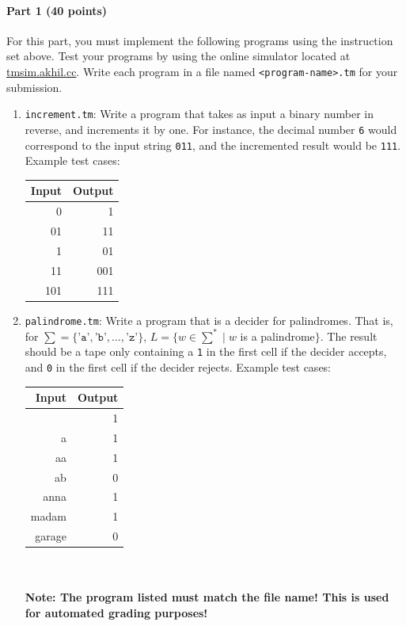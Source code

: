 \documentclass[10pt]{article}
\begin{document}
\paragraph{Part 1 (40 points)} For this part, you must implement the following programs using the instruction set above. Test your programs by using the online simulator located at \href{https://www.tmsim.akhil.cc}{tmsim.akhil.cc}. Write each program in a file named \texttt{<program-name>.tm} for your submission.
\begin{enumerate}
    \item \texttt{increment.tm}: Write a program that takes as input a binary number in reverse, and increments it by one. For instance, the decimal number \texttt{6} would correspond to the input string \texttt{011}, and the incremented result would be \texttt{111}. Example test cases:\\
    {\renewcommand{\arraystretch}{1.2}
    \begin{tabular}{|r|r|}
     \hline
     Input & Output \\ [0.5ex] 
     \hline
     0 & 1 \\ 
     \hline
     01 & 11 \\
     \hline
     1 & 01 \\
     \hline
     11 & 001 \\
     \hline
     101 & 111 \\ [1ex] 
     \hline
    \end{tabular}
    }
    \item \texttt{palindrome.tm}: Write a program that is a decider for palindromes. That is, for $\sum = \{\texttt{'a'}, \texttt{'b'}, \ldots, \texttt{'z'}\}$, $L = \{w \in \sum^* \mid w$ is a palindrome$\}$. The result should be a tape only containing a \texttt{1} in the first cell if the decider accepts, and \texttt{0} in the first cell if the decider rejects. Example test cases:\\
    {\renewcommand{\arraystretch}{1.2}
    \begin{tabular}{|r|r|}
     \hline
     Input & Output \\ [0.5ex] 
     \hline
      & 1 \\ 
     \hline
     a & 1 \\
     \hline
     aa & 1 \\
     \hline
     ab & 0 \\
     \hline
     anna & 1 \\
     \hline
     madam & 1 \\
     \hline
     garage & 0 \\ [1ex] 
     \hline
    \end{tabular}
    }\\\\
    \textbf{Note: The program listed must match the file name! This is used for automated grading purposes!}
\end{enumerate}
\end{document}
